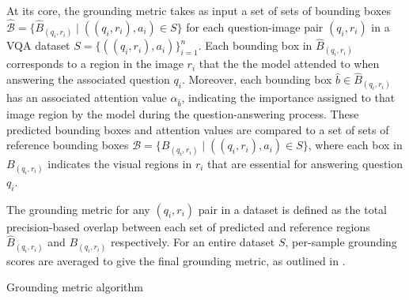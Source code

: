 At its core, the grounding metric takes as input a set of sets of bounding boxes \(\hat{\mathcal{B}} = \{\hat{B}_{(q_i, r_i)} \mid ((q_i, r_i), a_i) \in S\}\) for each question-image pair \((q_i, r_i)\) in a VQA dataset \(S = \{((q_i, r_i), a_i)\}_{i=1}^n\). Each bounding box in \(\hat{B}_{(q_i, r_i)}\) corresponds to a region in the image \(r_i\) that the the model attended to when answering the associated question \(q_i\). Moreover, each bounding box \(\hat{b} \in \hat{B}_{(q_i, r_i)}\) has an associated attention value \(\alpha_{\hat{b}}\), indicating the importance assigned to that image region by the model during the question-answering process. These predicted bounding boxes and attention values are compared to a set of sets of reference bounding boxes \(\mathcal{B} = \{B_{(q_i, r_i)} \mid ((q_i, r_i), a_i) \in S\}\), where each box in \(B_{(q_i, r_i)}\) indicates the visual regions in \(r_i\) that are essential for answering question \(q_i\).

The grounding metric for any \((q_i, r_i)\) pair in a dataset is defined as the total precision-based overlap between each set of predicted and reference regions \(\hat{B}_{(q_i, r_i)}\) and \(B_{(q_i, r_i)}\) respectively. For an entire dataset \(S\), per-sample grounding scores are averaged to give the final grounding metric, as outlined in \algorithmautorefname{ \ref{algorithm:grounding}}.

\begin{algorithm}[htbp]
    \caption[Grounding metric algorithm.]{Grounding metric algorithm}
    \label{algorithm:grounding}
\end{algorithm}


